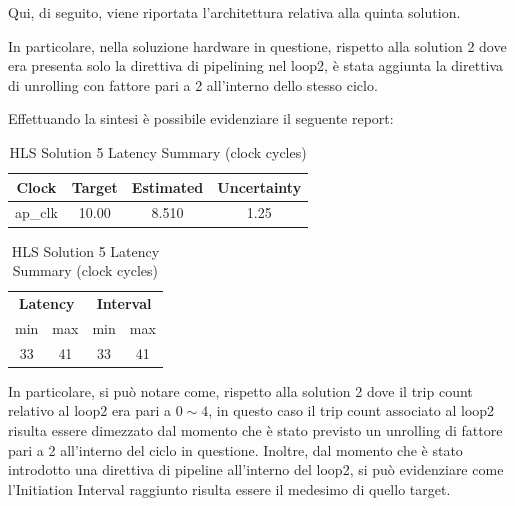 Qui, di seguito, viene riportata l'architettura relativa alla quinta solution.



In particolare, nella soluzione hardware in questione, rispetto alla solution 2 dove era presenta solo la direttiva di pipelining nel loop2, è stata aggiunta la direttiva di unrolling con fattore pari a 2 all'interno dello stesso ciclo.

Effettuando la sintesi è possibile evidenziare il seguente report:\\

\begin{table}[H]
	\centering
	\begin{minipage}[t]{0.45\linewidth}
		\centering
		\begin{tabular}{|c|c|c|c|}
			\hline
			\textbf{Clock} & \textbf{Target} & \textbf{Estimated} & \textbf{Uncertainty} \\
			\hline
			ap\_clk & 10.00 & 8.510 & 1.25 \\
			\hline
		\end{tabular}
		\caption{HLS Solution 5 Timing Summary (ns)}
		\label{tab:hls-solution-5-timing-summary}
	\end{minipage}
	\hfill
	\begin{minipage}[t]{0.45\linewidth}
		\centering
		\begin{tabular}{|c|c|c|c|}
			\hline
			\multicolumn{2}{|c|}{\textbf{Latency}} & \multicolumn{2}{|c|}{\textbf{Interval}} \\
			min & max & min & max \\
			\hline
			33 & 41 & 33 & 41 \\
			\hline
		\end{tabular}
		\caption{HLS Solution 5 Latency Summary (clock cycles)}
		\label{tab:hls-solution-5-latency-summary}
	\end{minipage}
\end{table}

In particolare, si può notare come, rispetto alla solution 2 dove il trip count relativo al loop2 era pari a $0\sim4$, in questo caso il trip count associato al loop2 risulta essere dimezzato dal momento che è stato previsto un unrolling di fattore pari a 2 all'interno del ciclo in questione. Inoltre, dal momento che è stato introdotto una direttiva di pipeline all'interno del loop2, si può evidenziare come l'Initiation Interval raggiunto risulta essere il medesimo di quello target.

